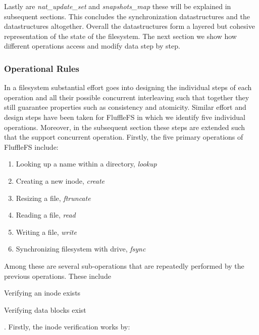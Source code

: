 Lastly are \textit{nat\_update\_set} and \textit{snapshots\_map} these will be
explained in subsequent sections. This concludes the synchronization
datastructures and the datastructures altogether. Overall the datastructures
form a layered but cohesive representation of the state of the filesystem. The
next section we show how different operations access and modify data step by
step.

\subsubsection{Operational Rules}

In a filesystem substantial effort goes into designing the individual steps of
each operation and all their possible concurrent interleaving such that
together they still guarantee properties such as consistency and atomicity.
Similar effort and design steps have been taken for FluffleFS in which we
identify five individual operations. Moreover, in the subsequent section these
steps are extended such that the support concurrent operation. Firstly, the
five primary operations of FluffleFS include:

\begin{enumerate}
    \item Looking up a name within a directory, \textit{lookup}
    \item Creating a new inode, \textit{create}
    \item Resizing a file, \textit{ftruncate}
    \item Reading a file, \textit{read}
    \item Writing a file, \textit{write}
    \item Synchronizing filesystem with drive, \textit{fsync}
\end{enumerate}

Among these are several sub-operations that are repeatedly performed by the
previous operations. These include \begin{enumerate*} \item Verifying an inode
exists \item Verifying data blocks exist \end{enumerate*}. Firstly, the
inode verification works by:

